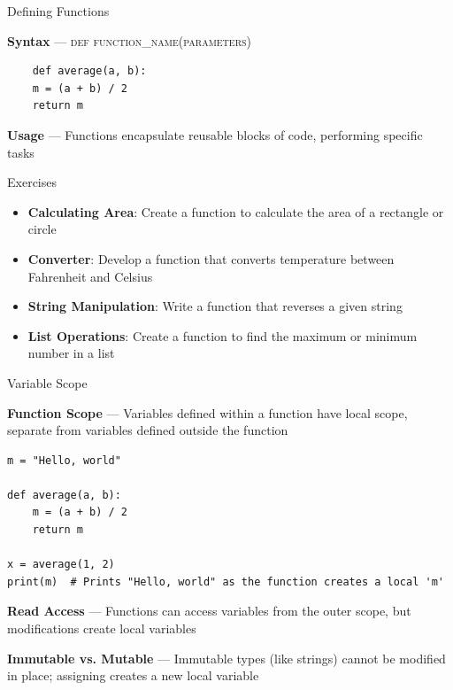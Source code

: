 \documentclass[
	11pt, 
]{beamer}
\begin{document}
\begin{frame}[fragile]{Defining Functions}

\textbf{Syntax} --- \textsc{def function\_name(parameters)}

\begin{verbatim}
    def average(a, b):
    m = (a + b) / 2
    return m
\end{verbatim}

\textbf{Usage} --- Functions encapsulate reusable blocks of code, performing specific tasks

\begin{alertblock}{Exercises}
    \begin{itemize}   
        \item \textbf{Calculating Area}: Create a function to calculate the area of a rectangle or circle
        \item \textbf{Converter}: Develop a function that converts temperature between Fahrenheit and Celsius
        \item \textbf{String Manipulation}: Write a function that reverses a given string
        \item \textbf{List Operations}: Create a function to find the maximum or minimum number in a list    
    \end{itemize} 
\end{alertblock}

\end{frame}



\begin{frame}[fragile]{Variable Scope}

\textbf{Function Scope} --- Variables defined within a function have local scope, separate from variables defined outside the function

\begin{verbatim}
m = "Hello, world"

def average(a, b):
    m = (a + b) / 2
    return m

x = average(1, 2)
print(m)  # Prints "Hello, world" as the function creates a local 'm'

\end{verbatim}

\textbf{Read Access} --- Functions can access variables from the outer scope, but modifications create local variables

\vspace{.5cm}

\textbf{Immutable vs. Mutable} --- Immutable types (like strings) cannot be modified in place; assigning creates a new local variable

\end{frame}
\end{document}
